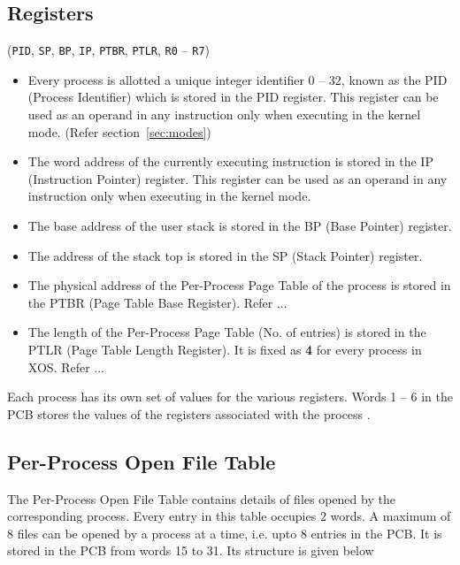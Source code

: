 \documentclass[10pt]{report}
\begin{document}
	  \subsection{Registers} (\texttt{PID}, \texttt{SP}, \texttt{BP}, \texttt{IP}, \texttt{PTBR}, \texttt{PTLR}, \texttt{R0} -- \texttt{R7}) \\ 
\begin{itemize}
	\item Every process is allotted a unique integer identifier 0 -- 32, known as the PID (Process Identifier) which is stored in the PID register. This register can be used as an operand in any instruction only when executing in the kernel mode. (Refer section~\ref{sec:modes})
	
	\item The word address of the currently executing instruction is stored in the IP (Instruction Pointer) register. This register can be used as an operand in any instruction only when executing in the kernel mode.
	\item The base address of the user stack is stored in the BP (Base Pointer) register. 
	\item The address of the stack top is stored in the SP (Stack Pointer) register. 
	\item The physical address of the Per-Process Page Table of the process is stored in the PTBR (Page Table Base Register). Refer ...
	\item The length of the Per-Process Page Table (No. of entries) is stored in the PTLR (Page Table Length Register). It is fixed as \textbf{4} for every process in XOS. Refer ... 
	
\end{itemize}
Each process has its own set of values for the various registers. Words  1 -- 6 in the PCB stores the values of the registers associated with the process .
	
\subsection{Per-Process Open File Table} 
	 
	  The Per-Process Open File Table contains details of files opened by the corresponding process. Every entry in this table occupies 2 words. A maximum of 8 files can be opened by a process at a time, i.e. upto 8 entries in the PCB. It is stored in the PCB from words 15 to 31. Its structure is given below
\end{document}
